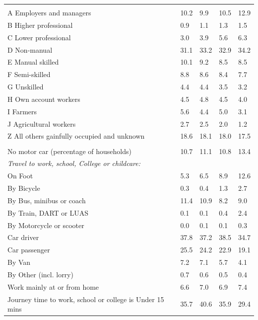 \documentclass{article}
\begin{document}
\begin{table}[h]
\begin{tabular}{KTTTT}
\hline
    \\ 
    \hline
A Employers and managers & 10.2&  9.9& 10.5& 12.9\\
B Higher professional & 0.9& 1.1& 1.3& 1.5\\
C Lower professional & 3.0& 3.9& 5.6& 6.3\\
D Non-manual & 31.1& 33.2& 32.9& 34.2\\
E Manual skilled & 10.1&  9.2&  8.5&  8.5\\
F Semi-skilled & 8.8& 8.6& 8.4& 7.7\\
G Unskilled & 4.4& 4.4& 3.5& 3.2\\
H Own account workers & 4.5& 4.8& 4.5& 4.0\\
I Farmers & 5.6& 4.4& 5.0& 3.1\\
J Agricultural workers & 2.7& 2.5& 2.0& 1.2\\
Z All others gainfully occupied and unknown & 18.6& 18.1& 18.0& 17.5\\
\hline
{}\hline
    \\ 
    \hline
No motor car (percentage of households) & 10.7& 11.1& 10.8& 
13.4\\
    \hline 
\emph{Travel to work, school, College or childcare:} & & & \\
\quad On Foot &  5.3&  6.5&  8.9& 12.6\\ 
\quad By Bicycle & 0.3& 0.4& 1.3& 2.7\\ 
\quad By Bus, minibus or coach & 11.4& 10.9&  8.2&  9.0\\
\quad By Train, DART or LUAS & 0.1& 0.1& 0.4& 2.4\\
\quad By Motorcycle or scooter & 0.0& 0.1& 0.1& 0.3\\
\quad Car driver & 37.8 & 37.2& 38.5& 34.7\\
\quad Car passenger & 25.5& 24.2& 22.9& 19.1\\
\quad By Van & 7.2& 7.1& 5.7& 4.1\\
\quad By Other (incl. lorry) & 0.7& 0.6& 0.5& 0.4\\
    \hline
Work mainly at or from home & 6.6& 7.0& 6.9& 7.4\\
Journey time to work, school or college is Under 15 mins & 35.7& 40.6& 35.9& 29.4\\

\end{tabular}
\end{table}
\end{document}
